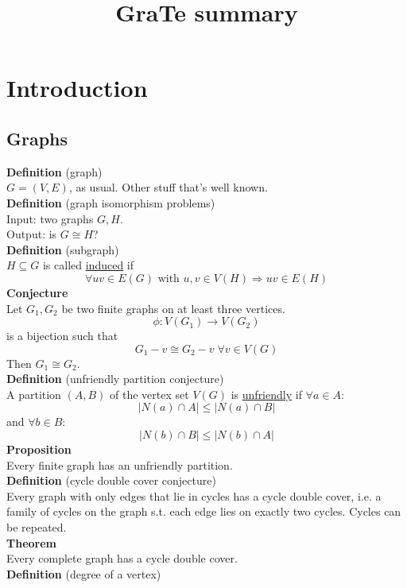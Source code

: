 \documentclass[a4paper, 12pt]{article}
\begin{document}
	\begin{titlepage} 
		\title{GraTe summary}
		\clearpage\maketitle
		\thispagestyle{empty}
	\end{titlepage}
	\tableofcontents
	\section{Introduction}
	\subsection{Graphs}
	\textbf{Definition} (graph)\\
	$G = (V,E)$, as usual. Other stuff that's well known.\\
	\textbf{Definition} (graph isomorphism problems)\\
	Input: two graphs $G,H$.\\
	Output: is $G \cong H$?\\
	\textbf{Definition} (subgraph)\\
	$H \subseteq G$ is called \underline{induced} if \[\forall uv \in E(G) \text{ with } u,v \in V(H) \Rightarrow uv \in E(H)\]
	\textbf{Conjecture}\\
	Let $G_1, G_2$ be two finite graphs on at least three vertices. \[\phi: V(G_1) \to V(G_2)\] is a bijection such that \[G_1-v \cong G_2-v \; \forall v\in V(G)\]
	Then $G_1 \cong G_2$.\\
	\textbf{Definition} (unfriendly partition conjecture)\\
	A partition $(A,B)$ of the vertex set $V(G)$ is \underline{unfriendly} if $\forall a \in A:$\[\left|N(a) \cap A \right| \leq \left|N(a) \cap B\right|\] and $\forall b \in B$: \[\left|N(b) \cap B\right| \leq \left|N(b) \cap A\right|\]
	\textbf{Proposition}\\
	Every finite graph has an unfriendly partition.\\
	\textbf{Definition} (cycle double cover conjecture)\\
	Every graph with only edges that lie in cycles has a cycle double cover, i.e. a family of cycles on the graph s.t. each edge lies on exactly two cycles. Cycles can be repeated.\\
	\textbf{Theorem}\\
	Every complete graph has a cycle double cover.\\
	\textbf{Definition} (degree of a vertex)\\
\end{document}
